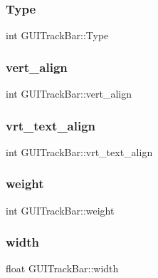 \subsubsection{\texorpdfstring{Type}{Type}}
{\footnotesize\ttfamily int G\+U\+I\+Track\+Bar\+::\+Type}

\hypertarget{class_g_u_i_track_bar_a5b7b48bc86d79e295bdf8abec8c8053b}{}\label{class_g_u_i_track_bar_a5b7b48bc86d79e295bdf8abec8c8053b} 
\subsubsection{\texorpdfstring{vert\+\_\+align}{vert\_align}}
{\footnotesize\ttfamily int G\+U\+I\+Track\+Bar\+::vert\+\_\+align}

\hypertarget{class_g_u_i_track_bar_ae81d8873f84612dc614a71f28988350c}{}\label{class_g_u_i_track_bar_ae81d8873f84612dc614a71f28988350c} 
\subsubsection{\texorpdfstring{vrt\+\_\+text\+\_\+align}{vrt\_text\_align}}
{\footnotesize\ttfamily int G\+U\+I\+Track\+Bar\+::vrt\+\_\+text\+\_\+align}

\hypertarget{class_g_u_i_track_bar_ab0aa11d466d1493bd67044e8a8de5b5e}{}\label{class_g_u_i_track_bar_ab0aa11d466d1493bd67044e8a8de5b5e} 
\subsubsection{\texorpdfstring{weight}{weight}}
{\footnotesize\ttfamily int G\+U\+I\+Track\+Bar\+::weight}

\hypertarget{class_g_u_i_track_bar_af8f3aeb98ad1f4d63a4b07b353d720dc}{}\label{class_g_u_i_track_bar_af8f3aeb98ad1f4d63a4b07b353d720dc} 
\subsubsection{\texorpdfstring{width}{width}}
{\footnotesize\ttfamily float G\+U\+I\+Track\+Bar\+::width}

